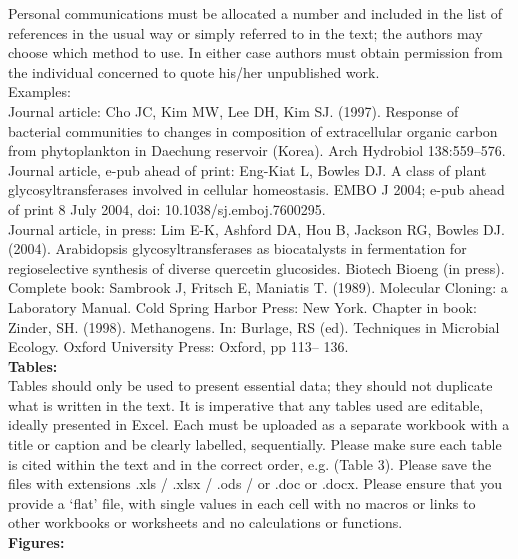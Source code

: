 \documentclass{article}
\begin{document}
Personal communications must be allocated a number and included in the
list of references in the usual way or simply referred to in the text;
the authors may choose which method to use. In either case authors must
obtain permission from the individual concerned to quote his/her
unpublished work.\\

Examples:\\

Journal article: Cho JC, Kim MW, Lee DH, Kim SJ. (1997). Response of
bacterial communities to changes in composition of extracellular organic
carbon from phytoplankton in Daechung reservoir (Korea). Arch Hydrobiol
138:559--576.\\

Journal article, e-pub ahead of print: Eng-Kiat L, Bowles DJ. A class of
plant glycosyltransferases involved in cellular homeostasis. EMBO J
2004; e-pub ahead of print 8 July 2004, doi: 10.1038/sj.emboj.7600295.\\

Journal article, in press: Lim E-K, Ashford DA, Hou B, Jackson RG,
Bowles DJ. (2004). Arabidopsis glycosyltransferases as biocatalysts in
fermentation for regioselective synthesis of diverse quercetin
glucosides. Biotech Bioeng (in press).\\

Complete book: Sambrook J, Fritsch E, Maniatis T. (1989). Molecular
Cloning: a Laboratory Manual. Cold Spring Harbor Press: New York.
Chapter in book: Zinder, SH. (1998). Methanogens. In: Burlage, RS (ed).
Techniques in Microbial Ecology. Oxford University Press: Oxford, pp
113-- 136.~\\

\textbf{Tables:}\\

Tables should only be used to present essential data; they should not
duplicate what is written in the text. It is imperative that any tables
used are editable, ideally presented in Excel. Each must be uploaded as
a separate workbook with a title or caption and be clearly labelled,
sequentially. Please make sure each table is cited within the text and
in the correct order, e.g. (Table 3). Please save the files with
extensions .xls / .xlsx / .ods / or .doc or .docx. Please ensure that
you provide a `flat' file, with single values in each cell with no
macros or links to other workbooks or worksheets and no calculations or
functions.\\

\textbf{Figures:}\\
\end{document}
